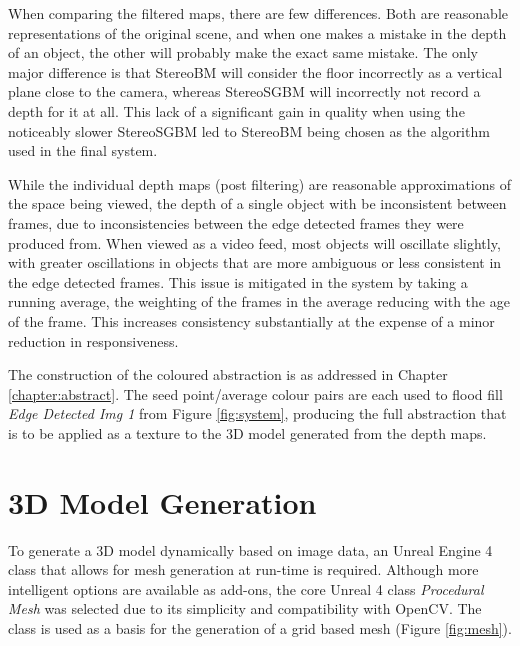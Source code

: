 When comparing the filtered maps, there are few differences. Both are reasonable representations of the original scene, and when one makes a mistake in the depth of an object, the other will probably make the exact same mistake. The only major difference is that StereoBM will consider the floor incorrectly as a vertical plane close to the camera, whereas StereoSGBM will incorrectly not record a depth for it at all. This lack of a significant gain in quality when using the noticeably slower StereoSGBM led to StereoBM being chosen as the algorithm used in the final system.

While the individual depth maps (post filtering) are reasonable approximations of the space being viewed, the depth of a single object with be inconsistent between frames, due to inconsistencies between the edge detected frames they were produced from. When viewed as a video feed, most objects will oscillate slightly, with greater oscillations in objects that are more ambiguous or less consistent in the edge detected frames. This issue is mitigated in the system by taking a running average, the weighting of the frames in the average reducing with the age of the frame. This increases consistency substantially at the expense of a minor reduction in responsiveness.

The construction of the coloured abstraction is as addressed in Chapter \ref{chapter:abstract}. The seed point/average colour pairs are each used to flood fill \emph{Edge Detected Img 1} from Figure \ref{fig:system}, producing the full abstraction that is to be applied as a texture to the 3D model generated from the depth maps.

\section{3D Model Generation}

To generate a 3D model dynamically based on image data, an Unreal Engine 4 class that allows for mesh generation at run-time is required. Although more intelligent options are available as add-ons, the core Unreal 4 class \emph{Procedural Mesh} was selected due to its simplicity and compatibility with OpenCV. The class is used as a basis for the generation of a grid based mesh (Figure \ref{fig:mesh}).

